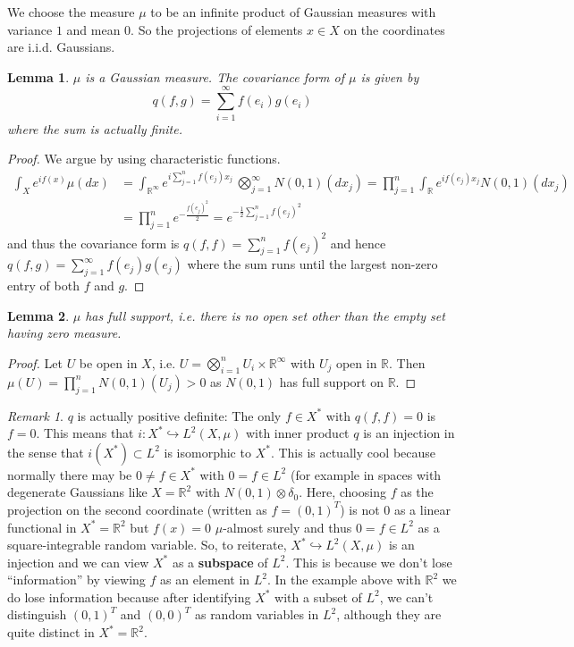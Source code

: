 \documentclass{scrartcl}
\newtheorem{lemma}{Lemma}
\theoremstyle{definition}
\theoremstyle{remark}
\newtheorem{remark}{Remark}
\newcommand{\R}{\mathbb R}
\begin{document}
We choose the measure $\mu$ to be an infinite product of Gaussian measures with variance $1$ and mean $0$. So the projections of elements $x\in X$ on the coordinates are i.i.d. Gaussians.
\begin{lemma}\label{lem:Gaussian}
$\mu$ is a Gaussian measure. The covariance form of $\mu$ is given by
\[ q(f,g) = \sum_{i=1}^\infty f(e_i)g(e_i) \]
where the sum is actually finite.
\end{lemma}
\begin{proof}
We argue by using characteristic functions. 
\begin{align*}
\int_X e^{if(x)}\mu(dx) &= \int_{\R^\infty} e^{i\sum_{j=1}^n f(e_j) x_j}\, \bigotimes_{j=1}^\infty N(0,1)(dx_j) = \prod_{j=1}^n \int_\R e^{if(e_j)x_j}N(0,1)(dx_j)\\
&= \prod_{j=1}^n e^{-\frac{f(e_j)^2}{2}} = e^{-\frac{1}{2}\sum_{j=1}^n f(e_j)^2}
\end{align*}
and thus the covariance form is $q(f, f) = \sum_{j=1}^n f(e_j)^2$ and hence $q(f,g)=\sum_{j=1}^\infty f(e_j)g(e_j)$ where the sum runs until the largest non-zero entry of both $f$ and $g$.
\end{proof}
\begin{lemma}
$\mu$ has full support, i.e. there is no open set other than the empty set having zero measure.
\end{lemma}
\begin{proof}
Let $U$ be open in $X$, i.e. $U = \bigotimes_{i=1}^n U_i \times \R^\infty$ with $U_j$ open in $\R$. Then $\mu(U) = \prod_{j=1}^n N(0,1)(U_j) > 0$ as $N(0,1)$ has full support on $\R$.
\end{proof}
\begin{remark}
$q$ is actually positive definite: The only $f\in X^*$ with $q(f, f) = 0$ is $f = 0$. This means that $i: X^*\hookrightarrow L^2(X, \mu)$ with inner product $q$ is an injection in the sense that $i(X^*) \subset L^2$ is isomorphic to $X^*$. This is actually cool because normally there may be $0 \neq f \in X^*$ with $0 = f \in L^2$ (for example in spaces with degenerate Gaussians like $X= \R^2$ with $N(0,1) \otimes \delta_0$. Here, choosing $f$ as the projection on the second coordinate (written as $f = (0,1)^T$) is not $0$ as a linear functional in $X^* = \R^2$ but $f(x) = 0$ $\mu$-almost surely and thus $0 = f\in L^2$ as a square-integrable random variable.
So, to reiterate, $X^*\hookrightarrow L^2(X, \mu)$ is an injection and we can view $X^*$ as a \textbf{subspace} of $L^2$. This is because we don't lose ``information'' by viewing $f$ as an element in $L^2$. In the example above with $\R^2$ we do lose information because after identifying $X^*$ with a subset of $L^2$, we can't distinguish $(0,1)^T$ and $(0,0)^T$ as random variables in $L^2$, although they are quite distinct in $X^* = \R^2$.
\end{remark}
\end{document}
